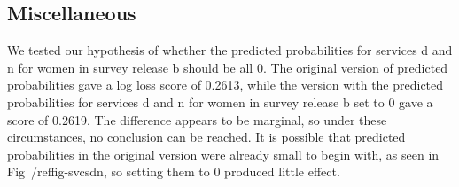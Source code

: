 \documentclass{article}\usepackage[]{graphicx}\usepackage[]{color}
\begin{document}
                                                                                                                                                                                                                                                                                                                                                                                                                                                                                                                                                                                                
                                                                                                                                                                                                                                                                                                                                                                                                                                                                                                                                                                                                \subsection{Miscellaneous}
                                                                                                                                                                                                                                                                                                                                                                                                                                                                                                                                                                                                We tested our hypothesis of whether the predicted probabilities for services d and n for women in survey release b should be all 0. The original version of predicted probabilities gave a log loss score of 0.2613, while the version with the predicted probabilities for services d and n for women in survey release b set to 0 gave a score of 0.2619. The difference appears to be marginal, so under these circumstances, no conclusion can be reached. It is possible that predicted probabilities in the original version were already small to begin with, as seen in Fig~/ref{fig-svcsdn}, so setting them to 0 produced little effect.
                                                                                                                                                                                                                                                                                                                                                                                                                                                                                                                                                                                                
\end{document}
